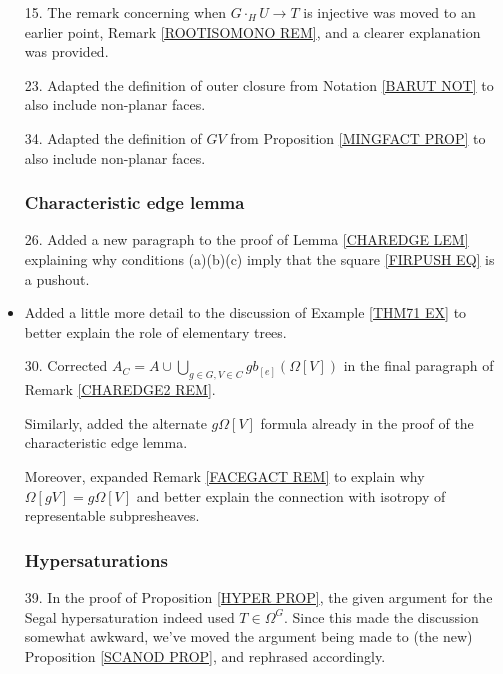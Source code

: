 \documentclass{article}
\begin{document}
\begin{itemize}
\item[15.] The remark concerning when $G\cdot_H U \to T$ is injective was moved to an earlier point, Remark \ref{ROOTISOMONO REM}, and a clearer explanation was provided. %

\item[23.] Adapted the definition of outer closure from Notation \ref{BARUT NOT} to also include non-planar faces.
      
\item[34.] Adapted the definition of $GV$ from Proposition \ref{MINGFACT PROP} to also include non-planar faces.
      



      \subsubsection*{Characteristic edge lemma}
\item[26.] Added a new paragraph to the proof of Lemma \ref{CHAREDGE LEM} explaining why conditions (a)(b)(c) imply that the square \eqref{FIRPUSH EQ} is a pushout. %

\item Added a little more detail to the discussion of Example \ref{THM71 EX} to better explain the role of elementary trees.

\item[30.] Corrected $A_C = 
      A \cup \bigcup_{g\in G,V \in C} g b_{[e]}(\Omega[V])$ in the final paragraph of Remark \ref{CHAREDGE2 REM}.
      
      Similarly, added the alternate $g \Omega[V]$ formula already in the proof of the characteristic edge lemma.
      
      Moreover, expanded Remark \ref{FACEGACT REM} to explain why $\Omega[gV] = g\Omega[V]$ and better explain the connection with isotropy of representable subpresheaves. %
      

      
            
      \subsubsection*{Hypersaturations}
\item[39.] In the proof of Proposition \ref{HYPER PROP},
      the given argument for the Segal hypersaturation indeed used $T \in \Omega^G$. Since this made the discussion somewhat awkward, we've moved the argument being made to (the new) Proposition \ref{SCANOD PROP}, and rephrased accordingly. %
      

\end{itemize}
\end{document}
